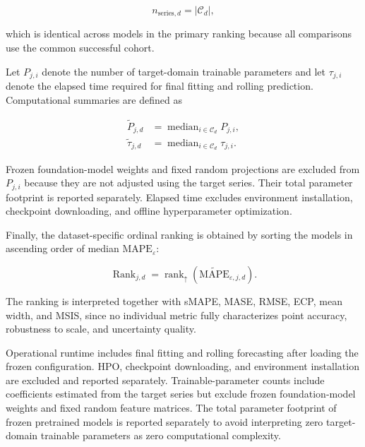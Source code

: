 \documentclass[review,number,sort&compress]{elsarticle}
\begin{document}
\begin{equation}
n_{\mathrm{series},d}
=
|\mathcal{C}_d|,
\label{eq:n_series}
\end{equation}

which is identical across models in the primary ranking because all comparisons use the common successful cohort.

Let $P_{j,i}$ denote the number of target-domain trainable parameters and let $\tau_{j,i}$ denote the elapsed time required for final fitting and rolling prediction. Computational summaries are defined as

\begin{align}
\widetilde{P}_{j,d}
&=
\operatorname{median}_{i\in\mathcal{C}_d}
P_{j,i},
\\
\widetilde{\tau}_{j,d}
&=
\operatorname{median}_{i\in\mathcal{C}_d}
\tau_{j,i}.
\label{eq:computational_aggregation}
\end{align}

Frozen foundation-model weights and fixed random projections are excluded from $P_{j,i}$ because they are not adjusted using the target series. Their total parameter footprint is reported separately. Elapsed time excludes environment installation, checkpoint downloading, and offline hyperparameter optimization.

Finally, the dataset-specific ordinal ranking is obtained by sorting the models in ascending order of median $\mathrm{MAPE}_{\varepsilon}$:

\begin{equation}
\operatorname{Rank}_{j,d}
=
\operatorname{rank}_{\uparrow}
\left(
    \widetilde{\mathrm{MAPE}}_{\varepsilon,j,d}
\right).
\label{eq:model_rank}
\end{equation}

The ranking is interpreted together with sMAPE, MASE, RMSE, ECP, mean width, and MSIS, since no individual metric fully characterizes point accuracy, robustness to scale, and uncertainty quality.

Operational runtime includes final fitting and rolling forecasting after loading the frozen configuration. HPO, checkpoint downloading, and environment installation are excluded and reported separately. Trainable-parameter counts include coefficients estimated from the target series but exclude frozen foundation-model weights and fixed random feature matrices. The total parameter footprint of frozen pretrained models is reported separately to avoid interpreting zero target-domain trainable parameters as zero computational complexity.
\end{document}
